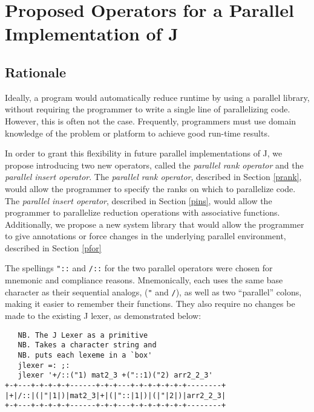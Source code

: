 \chapter{Proposed Operators for a Parallel Implementation of J} 
\label{paraop}

\section{Rationale}
Ideally, a program would automatically reduce runtime by using a parallel library, 
without requiring the programmer to write a single line of parallelizing code. 
However, this is often not the case. 
Frequently, programmers must use domain knowledge of the problem or platform to achieve good run-time results. 

In order to grant this flexibility in future parallel implementations of J, 
we propose introducing two new operators, called the \textit{parallel rank operator} 
and the \textit{parallel insert operator}.
The \textit{parallel rank operator}, described in Section \ref{prank}, 
would allow the programmer to specify the ranks on which to parallelize code.
The \textit{parallel insert operator}, described in Section \ref{pins}, 
would allow the programmer to parallelize reduction operations with associative functions.
Additionally, we propose a new system library
that would allow the programmer to give annotations or force changes in the underlying parallel environment,
described in Section \ref{pfor}

The spellings \texttt{"::}  and \texttt{/::} for the two parallel operators were chosen for mnemonic and compliance reasons.
Mnemonically, each uses the same base character as their sequential analogs, (\texttt{"} and \texttt{/}), 
as well as two ``parallel'' colons, making it easier to remember their functions.
They also require no changes be made to the existing J lexer\cite{ioj}, 
as demonstrated below:

\begin{singlespacing}
\begin{small}
\begin{verbatim}
   NB. The J Lexer as a primitive
   NB. Takes a character string and 
   NB. puts each lexeme in a `box'
   jlexer =: ;:
   jlexer '+/::("1) mat2_3 +("::1)("2) arr2_2_3'
+-+---+-+-+-+-+------+-+-+---+-+-+-+-+-+-+--------+
|+|/::|(|"|1|)|mat2_3|+|(|"::|1|)|(|"|2|)|arr2_2_3|
+-+---+-+-+-+-+------+-+-+---+-+-+-+-+-+-+--------+
\end{verbatim}
\end{small}
\end{singlespacing}

